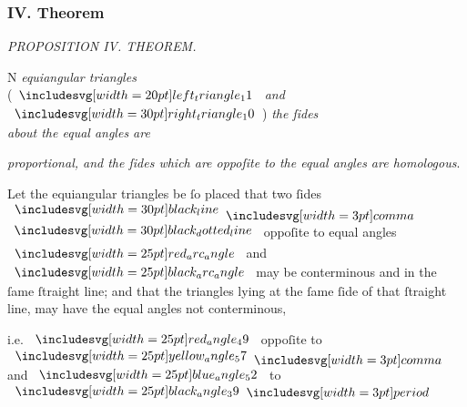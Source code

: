 \documentclass[11pt,preview]{standalone}
\begin{document}
\subsubsection{IV. Theorem}

\begin{minipage}[t]{0.43\textwidth}
    \vspace{20pt}
    
\end{minipage}%
\hfill
\begin{minipage}[t]{0.54\textwidth}
    \begin{center}
        \textit{PROPOSITION IV. THEOREM.}\label{book6pr4} \\
    \end{center}

    \hfill

    \begin{center}
        \raggedright \lettrine[lines=3, loversize=1, nindent=0pt]{}{}N \textit{equiangular triangles}\\ (\hspace{-1ex}$\img[0][0][20]{left_triangle_11}$ \textit{and} $\img[0][0][30]{right_triangle_10}$\hspace{-1ex}) \textit{the ſides\\ about the equal angles are}
    \end{center}
    \textit{proportional, and the ſides which are oppoſite to the equal angles are homologous}.
\end{minipage}

\hfill

\raggedright Let the equiangular triangles be ſo placed that two ſides $\blackline \bcomma$\\
$\dottedblackline$ oppoſite to equal angles $\img{red_arc_angle}$ and $\img{black_arc_angle}$ may be conterminous and in the ſame ſtraight line; and that the triangles lying at the ſame ſide of that ſtraight line, may have the equal angles not conterminous,

\begin{center}
    i.e. $\img{red_angle_49}$ oppoſite to $\img{yellow_angle_57} \bcomma$ and $\img{blue_angle_52}$ to $\img{black_angle_39} \bperiod$
\end{center}
\end{document}
